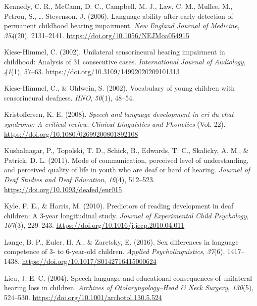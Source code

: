 \documentclass[
  english,
  man]{apa6}
\begin{document}
\leavevmode\hypertarget{ref-kennedy2006}{}%
Kennedy, C. R., McCann, D. C., Campbell, M. J., Law, C. M., Mullee, M., Petrou, S., \ldots{} Stevenson, J. (2006). Language ability after early detection of permanent childhood hearing impairment. \emph{New England Journal of Medicine}, \emph{354}(20), 2131--2141. \url{https://doi.org/10.1056/NEJMoa054915}

\leavevmode\hypertarget{ref-kiese-himmel2002}{}%
Kiese-Himmel, C. (2002). Unilateral sensorineural hearing impairment in childhood: Analysis of 31 consecutive cases. \emph{International Journal of Audiology}, \emph{41}(1), 57--63. \url{https://doi.org/10.3109/14992020209101313}

\leavevmode\hypertarget{ref-kiese-himmel2002a}{}%
Kiese-Himmel, C., \& Ohlwein, S. (2002). Vocabulary of young children with sensorineural deafness. \emph{HNO}, \emph{50}(1), 48--54.

\leavevmode\hypertarget{ref-kristoffersen2008}{}%
Kristoffersen, K. E. (2008). \emph{Speech and language development in cri du chat syndrome: A critical review}. \emph{Clinical Linguistics and Phonetics} (Vol. 22). \url{https://doi.org/10.1080/02699200801892108}

\leavevmode\hypertarget{ref-kushalnagar2011}{}%
Kushalnagar, P., Topolski, T. D., Schick, B., Edwards, T. C., Skalicky, A. M., \& Patrick, D. L. (2011). Mode of communication, perceived level of understanding, and perceived quality of life in youth who are deaf or hard of hearing. \emph{Journal of Deaf Studies and Deaf Education}, \emph{16}(4), 512--523. \url{https://doi.org/10.1093/deafed/enr015}

\leavevmode\hypertarget{ref-kyle2010}{}%
Kyle, F. E., \& Harris, M. (2010). Predictors of reading development in deaf children: A 3-year longitudinal study. \emph{Journal of Experimental Child Psychology}, \emph{107}(3), 229--243. \url{https://doi.org/10.1016/j.jecp.2010.04.011}

\leavevmode\hypertarget{ref-lange2016}{}%
Lange, B. P., Euler, H. A., \& Zaretsky, E. (2016). Sex differences in language competence of 3- to 6-year-old children. \emph{Applied Psycholinguistics}, \emph{37}(6), 1417--1438. \url{https://doi.org/10.1017/S0142716415000624}

\leavevmode\hypertarget{ref-lieu2004}{}%
Lieu, J. E. C. (2004). Speech-language and educational consequences of unilateral hearing loss in children. \emph{Archives of Otolaryngology--Head \& Neck Surgery}, \emph{130}(5), 524--530. \url{https://doi.org/10.1001/archotol.130.5.524}
\end{document}
